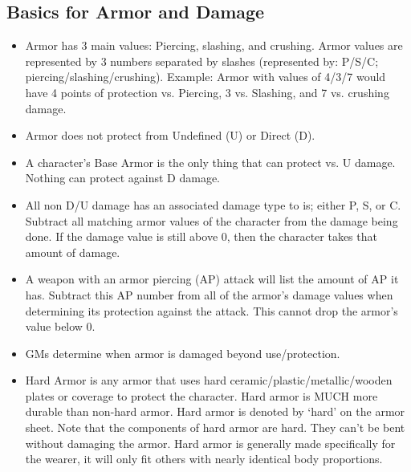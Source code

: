 \documentclass[twoside]{book}
\begin{document}
    

\subsection{Basics for Armor and Damage}
    
\begin{itemize}
      
  \item   Armor has 3 main values: Piercing, slashing, and
                 crushing. Armor values are represented by 3 numbers
                 separated by slashes (represented by: P/S/C;
                 piercing/slashing/crushing). Example: Armor with values
                 of 4/3/7 would have 4 points of protection vs. Piercing,
                 3 vs. Slashing, and 7 vs. crushing damage. 
  \item   Armor does not protect from Undefined (U) or
                 Direct (D). 
  \item   A character's Base Armor is the only thing
                 that can protect vs. U damage. Nothing can protect
                 against D damage. 
  \item   All non D/U damage has an associated damage type
                 to is; either P, S, or C. Subtract all matching armor
                 values of the character from the damage being done. If
                 the damage value is still above 0, then the character
                 takes that amount of damage. 
  \item   A weapon with an armor piercing (AP) attack will
                 list the amount of AP it has. Subtract this AP number
                 from all of the armor's damage values when
                 determining its protection against the attack. This
                 cannot drop the armor's value below 0. 
  \item   GMs determine when armor is damaged beyond
                 use/protection. 
  \item   Hard Armor is any armor that uses hard
                 ceramic/plastic/metallic/wooden plates or coverage to
                 protect the character. Hard armor is MUCH more durable
                 than non-hard armor. Hard armor is denoted by
                 `hard' on the armor sheet. Note that the
                 components of hard armor are hard. They can't be
                 bent without damaging the armor. Hard armor is generally
                 made specifically for the wearer, it will only fit
                 others with nearly identical body proportions. 

\end{itemize}
\end{document}
